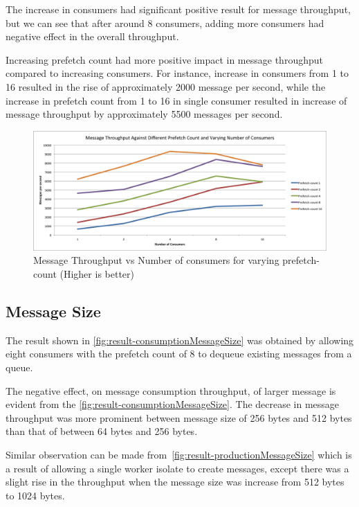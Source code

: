   The increase in consumers had significant positive result for message throughput, but we can see that after around 8 consumers, adding more consumers had negative effect in the overall throughput.

    Increasing prefetch count had more positive impact in message throughput compared to increasing consumers. For instance, increase in consumers from 1 to 16 resulted in the rise of approximately 2000 message per second, while the increase in prefetch count from 1 to 16 in single consumer resulted in increase of message throughput by approximately 5500 messages per second.

\begin{figure}[H]
  \centering
  \includegraphics[width=1\textwidth]{figures/01prefetch}
  \caption[Message Throughput vs Number of consumers for varying prefetch-count]{Message Throughput vs Number of consumers for varying prefetch-count (Higher is better)}
  \label{fig:result-prefetch}
\end{figure}

\subsection{Message Size}
\label{subsec:messageSize}
The result shown in \autoref{fig:result-consumptionMessageSize} was obtained by allowing eight consumers with the prefetch count of 8 to dequeue existing messages from a queue.

  The negative effect, on message consumption throughput, of larger message is evident from the  \autoref{fig:result-consumptionMessageSize}. The decrease in message throughput was more prominent between message size of 256 bytes and 512 bytes than that of between 64 bytes and 256 bytes.

  Similar observation can be made from~\autoref{fig:result-productionMessageSize} which is a result of allowing a single worker isolate to create messages, except there was a slight rise in the throughput when the message size was increase from 512 bytes to 1024 bytes.

